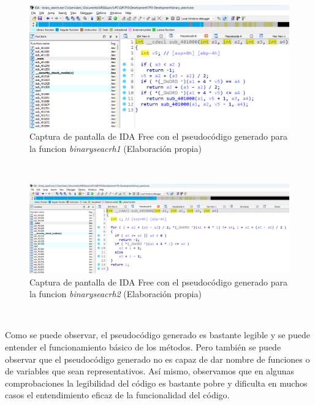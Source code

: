 \begin{figure}[H]
    \begin{center}
      \includegraphics[width=15cm]{figuras/Capitulo_03/IDAPro_binaryseacrh1.png}
    \end{center}
    \caption[Captura de pantalla de IDA Free con el pseudocódigo generado para la funcion \textit{binaryseacrh1}]{Captura de pantalla de IDA Free con el pseudocódigo generado para la funcion \textit{binaryseacrh1} (Elaboración propia)}
    \label{fig:IDAPro_binaryseacrh1}
\end{figure}\

\begin{figure}[H]
    \begin{center}
      \includegraphics[width=15cm]{figuras/Capitulo_03/IDAPro_binaryseacrh2.png}
    \end{center}
    \caption[Captura de pantalla de IDA Free con el pseudocódigo generado para la funcion \textit{binaryseacrh2}]{Captura de pantalla de IDA Free con el pseudocódigo generado para la funcion \textit{binaryseacrh2} (Elaboración propia)}
    \label{fig:IDAPro_binaryseacrh2}
\end{figure}\

Como se puede observar, el pseudocódigo generado es bastante legible y se puede
entender el funcionamiento básico de los métodos. Pero también se puede observar
que el pseudocódigo generado no es capaz de dar nombre de funciones o de variables
que sean representativos. Así mismo, observamos que en algunas comprobaciones la
legibilidad del código es bastante pobre y dificulta en muchos casos el entendimiento
eficaz de la funcionalidad del código.

